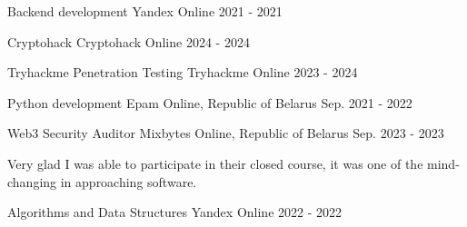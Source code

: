 \begin{cventries}


\cventry
{Backend development} %
{Yandex} %
{Online} %
{2021 - 2021} %
{ %
\begin{cvitems}
\end{cvitems}
}


\cventry
{Cryptohack} %
{Cryptohack} %
{Online} %
{2024 - 2024} %
{ %
\begin{cvitems}
\end{cvitems}
}


\cventry
{Tryhackme Penetration Testing} %
{Tryhackme} %
{Online} %
{2023 - 2024} %
{ %
\begin{cvitems}
\end{cvitems}
}



\cventry
{Python development} %
{Epam} %
{Online, Republic of Belarus} %
{Sep. 2021 - 2022} %
{ %
\begin{cvitems}
\end{cvitems} 
}


\cventry
{Web3 Security Auditor} %
{Mixbytes} %
{Online, Republic of Belarus} %
{Sep. 2023 - 2023} %
{ %
\begin{cvitems}
\item{ Very glad I was able to participate in their closed course, it was one of the mind-changing in approaching software. }
\end{cvitems} 
}


\cventry
{Algorithms and Data Structures} %
{Yandex} %
{Online} %
{2022 - 2022} %
{ %
\begin{cvitems}
\end{cvitems}
}

\end{cventries}